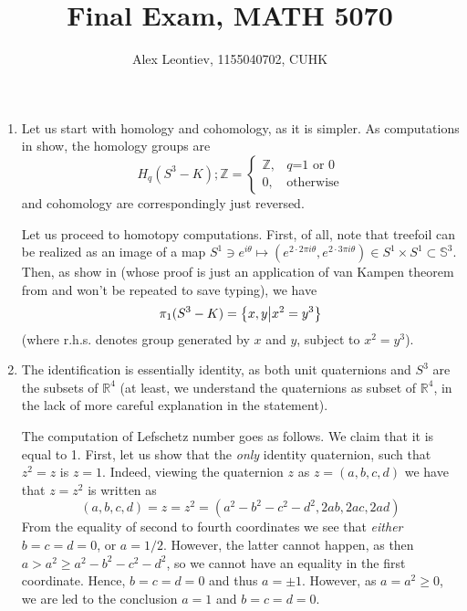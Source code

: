 \documentclass[8pt]{article} %
\title{Final Exam, MATH 5070}
\author{Alex Leontiev, 1155040702, CUHK}
\begin{document}
\maketitle
\begin{enumerate}[label=\bfseries \arabic*.]
	\item Let us start with homology and cohomology, as it is simpler. As computations in \cite[page 107]{gh} show, the homology groups are
		\[H_q(S^3-K);\mathbb{Z}=\left\{\begin{array}{ll}\mathbb{Z},&\mbox{$q$=1 or 0}\\0,&\mbox{otherwise}\end{array}\right.\]
		and cohomology are correspondingly just reversed.

		Let us proceed to homotopy computations. First, of all, note that treefoil can be realized as an image of a map
		$S^1\ni e^{i\theta}\mapsto(e^{2\cdot2\pi i\theta},e^{2\cdot3\pi i\theta})\in S^1\times S^1\subset\mathbb{S}^3$. Then, as
		show in \cite[Theorem 2.3.3]{martin} (whose proof is just an application of van Kampen theorem from \cite{gh} and won't be repeated
		to save typing), we have
		\[\pi_1(S^3-K)=\left\{x,y\big| x^2=y^3\right\}\]
		(where r.h.s. denotes group generated by $x$ and $y$, subject to $x^2=y^3$).
	\item The identification is essentially identity, as both unit quaternions and $S^3$ are the subsets of $\mathbb{R}^4$ (at least,
		we understand the quaternions as subset of $\mathbb{R}^4$, in the lack of more careful explanation in the statement).

		The computation of Lefschetz number goes as follows. We claim that it is equal to 1. First, let us show that the {\it only}
		identity quaternion, such that $z^2=z$ is $z=1$. Indeed, viewing the quaternion $z$ as $z=(a,b,c,d)$ we have that $z=z^2$ is written
		as
		\[(a,b,c,d)=z=z^2=(a^2-b^2-c^2-d^2,2ab,2ac,2ad)\]
		From the equality of second to fourth coordinates we see that {\it either} $b=c=d=0$, or $a=1/2$. However, the latter
		cannot happen, as then $a>a^2\geq a^2-b^2-c^2-d^2$, so we cannot have an equality in the first coordinate. Hence, $b=c=d=0$
		and thus $a=\pm 1$. However, as $a=a^2\geq0$, we are led to the conclusion $a=1$ and $b=c=d=0$.


\end{enumerate}
\end{document}
